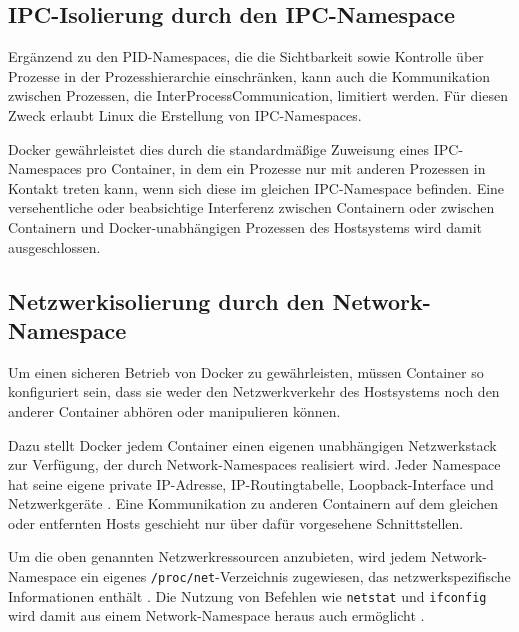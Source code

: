 \documentclass[../main.tex]{subfiles}
\begin{document}
    \subsection{\acrshort{IPC}-Isolierung durch den \acrshort{IPC}-Namespace}
			Ergänzend zu den PID-Namespaces, die die Sichtbarkeit sowie Kontrolle über Prozesse in der Prozesshierarchie einschränken, kann auch die Kommunikation zwischen Prozessen, die \gls{InterProcessCommunication}, limitiert werden. Für diesen Zweck erlaubt Linux die Erstellung von IPC-Namespaces.




			Docker gewährleistet dies durch die standardmäßige Zuweisung eines IPC-Namespaces pro Container, in dem ein Prozesse nur mit anderen Prozessen in Kontakt treten kann, wenn sich diese im gleichen IPC-Namespace befinden. Eine versehentliche oder beabsichtige Interferenz zwischen Containern oder zwischen Containern und Docker-unabhängigen Prozessen des Hostsystems wird damit ausgeschlossen.



    \subsection{Netzwerkisolierung durch den Network-Namespace}
			Um einen sicheren Betrieb von Docker zu gewährleisten, müssen Container so konfiguriert sein, dass sie weder den Netzwerkverkehr des Hostsystems noch den anderer Container abhören oder manipulieren können.

			Dazu stellt Docker jedem Container einen eigenen unabhängigen Netzwerkstack zur Verfügung, der durch Network-Namespaces realisiert wird. Jeder Namespace hat seine eigene private \acrshort{IP}-Adresse, IP-Routingtabelle, Loopback-Interface und Netzwerkgeräte \cite[S.2f.]{virtVSContainer}. Eine Kommunikation zu anderen Containern auf dem gleichen oder entfernten Hosts geschieht nur über dafür vorgesehene Schnittstellen.

			Um die oben genannten Netzwerkressourcen anzubieten, wird jedem Network-Namespace ein eigenes \texttt{/proc/net}-Verzeichnis zugewiesen, das netzwerkspezifische Informationen enthält \cite{proc}. Die Nutzung von Befehlen wie \texttt{netstat} und \texttt{ifconfig} wird damit aus einem Network-Namespace heraus auch ermöglicht \cite[S.7]{IBMcheckpointRestart}.
\end{document}

